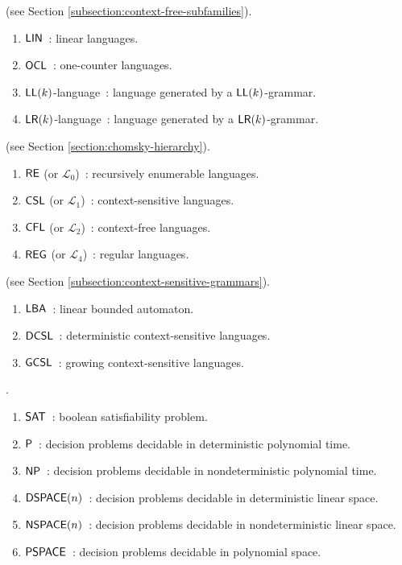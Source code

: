  (see Section \ref{subsection:context-free-subfamilies}).

\begin{enumerate}[]
\item $\textup{\sf LIN}$\ : linear languages.
\item $\textup{\sf OCL}$\ : one-counter languages.
\item $\textup{\sf LL}(k)$-language\ : language generated by a $\textup{\sf LL}(k)$-grammar.
\item $\textup{\sf LR}(k)$-language\ : language generated by a $\textup{\sf LR}(k)$-grammar.
\end{enumerate}

 (see Section \ref{section:chomsky-hierarchy}).

\begin{enumerate}[]
\item $\textup{\sf RE}$ (or $\mathcal{L}_0$)\ : recursively enumerable languages.
\item $\textup{\sf CSL}$ (or $\mathcal{L}_1$)\ : context-sensitive languages.
\item $\textup{\sf CFL}$ (or $\mathcal{L}_2$)\ : context-free languages.
\item $\textup{\sf REG}$ (or $\mathcal{L}_4$)\ : regular languages.
\end{enumerate}

 (see Section \ref{subsection:context-sensitive-grammars}).

\begin{enumerate}[]
\item $\textup{\sf LBA}$\ : linear bounded automaton.
\item $\textup{\sf DCSL}$\ : deterministic context-sensitive languages.
\item $\textup{\sf GCSL}$\ : growing context-sensitive languages.
\end{enumerate}

.

\begin{enumerate}[]
\item $\textup{\sf SAT}$\ : boolean satisfiability problem.
\item $\textup{\sf P}$\ : decision problems decidable in deterministic polynomial time.
\item $\textup{\sf NP}$\ : decision problems decidable in nondeterministic polynomial time.
\item $\textup{\sf DSPACE}(n)$\ : decision problems decidable in deterministic linear space.
\item $\textup{\sf NSPACE}(n)$\ : decision problems decidable in nondeterministic linear space.
\item $\textup{\sf PSPACE}$\ : decision problems decidable in polynomial space.
\end{enumerate}

